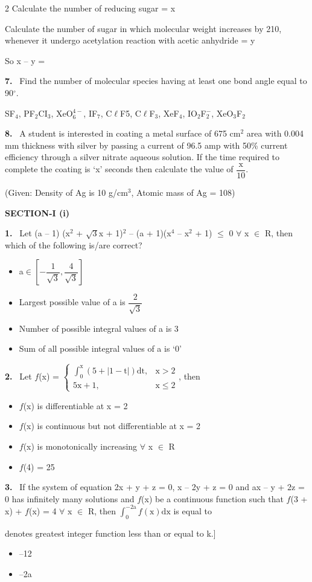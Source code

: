 \documentclass[10pt]{extarticle}
\newcommand{\papersec}[1]{\par\bigskip{\centering\Large\bfseries PAPER-#1\par}\medskip}
\newcommand{\partsec}[2]{\par\medskip\noindent{\large\bfseries PART-#1: #2}\par\smallskip}
\newcommand{\sect}[1]{\par\smallskip\noindent\textbf{#1}\par}
\newcommand{\qn}[1]{\par\smallskip\noindent\textbf{#1.}~}
\newenvironment{qoptions}{\begin{itemize}[leftmargin=1.8em,itemsep=1pt,topsep=2pt,label={}]}{\end{itemize}}
\newcommand{\opt}[2]{\item[(#1)] #2}
\begin{document}
\begin{multicols}{2}
Calculate the number of reducing sugar = x\par
Calculate the number of sugar in which molecular weight increases by 210, whenever it undergo acetylation reaction with acetic anhydride = y\par
So x -- y =
\qn{7} Find the number of molecular species having at least one bond angle equal to 90$^\circ$.\par
SF$_4$, PF$_2$CI$_3$, XeO$_6^{4-}$, IF$_7$, C$\ell$F5, C$\ell$F$_3$, XeF$_4$, IO$_2$F$_2^-$, XeO$_3$F$_2$
\qn{8} A student is interested in coating a metal surface of 675 cm$^2$ area with 0.004 mm thickness with silver by passing a current of 96.5 amp with 50\% current efficiency through a silver nitrate aqueous solution. If the time required to complete the coating is `x' seconds then calculate the value of $\dfrac{\text{x}}{10}$.\par
(Given: Density of Ag is 10 g/cm$^3$, Atomic mass of Ag = 108)
\raggedcolumns
\papersec{2}
\partsec{3}{MATHEMATICS}
\sect{SECTION-I (i)}
\qn{1} Let (a -- 1) (x$^2$ + $\sqrt{3}$x + 1)$^2$ -- (a + 1)(x$^4$ -- x$^2$ + 1) $\leq$ 0 $\forall$ x $\in$ R, then which of the following is/are correct?
\begin{qoptions}
\opt{A}{a$\in\left[-\dfrac{1}{\sqrt{3}},\dfrac{4}{\sqrt{3}}\right]$}
\opt{B}{Largest possible value of a is $\dfrac{2}{\sqrt{3}}$}
\opt{C}{Number of possible integral values of a is 3}
\opt{D}{Sum of all possible integral values of a is `0'}
\end{qoptions}
\qn{2} Let $f$(x) = $\begin{cases}\displaystyle\int_0^{\text{x}}(5+|1-\text{t}|)\text{dt}, & \text{x}>2\\ 5\text{x}+1, & \text{x}\leqslant2\end{cases}$, then
\begin{qoptions}
\opt{A}{$f$(x) is differentiable at x = 2}
\opt{B}{$f$(x) is continuous but not differentiable at x = 2}
\opt{C}{$f$(x) is monotonically increasing $\forall$ x $\in$ R}
\opt{D}{$f$(4) = 25}
\end{qoptions}
\qn{3} If the system of equation 2x + y + z = 0, x -- 2y + z = 0 and ax -- y + 2z = 0 has infinitely many solutions and $f$(x) be a continuous function such that $f$(3 + x) + $f$(x) = 4 $\forall$ x $\in$ R, then $\displaystyle\int_0^{-2\text{a}}f(\text{x})\text{dx}$ is equal to\par
[Note : [k] denotes greatest integer function less than or equal to k.]
\begin{qoptions}
\opt{A}{--12}
\opt{B}{--2a}

\end{qoptions}
\end{multicols}
\end{document}
